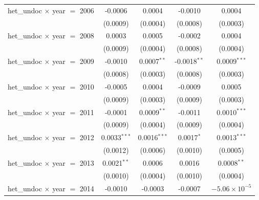 \begin{tabular}{lcccc}
   het\_undoc $\times$ year $=$ 2006               & -0.0006            & 0.0004                    & -0.0010                & 0.0004\\   
                                                   & (0.0009)           & (0.0004)                  & (0.0008)               & (0.0003)\\   
   het\_undoc $\times$ year $=$ 2008               & 0.0003             & 0.0005                    & -0.0002                & 0.0004\\   
                                                   & (0.0009)           & (0.0004)                  & (0.0008)               & (0.0004)\\   
   het\_undoc $\times$ year $=$ 2009               & -0.0010            & 0.0007$^{**}$             & -0.0018$^{**}$         & 0.0009$^{***}$\\   
                                                   & (0.0008)           & (0.0003)                  & (0.0008)               & (0.0003)\\   
   het\_undoc $\times$ year $=$ 2010               & -0.0005            & 0.0004                    & -0.0009                & 0.0005\\   
                                                   & (0.0009)           & (0.0003)                  & (0.0009)               & (0.0003)\\   
   het\_undoc $\times$ year $=$ 2011               & -0.0001            & 0.0009$^{**}$             & -0.0011                & 0.0010$^{***}$\\   
                                                   & (0.0009)           & (0.0004)                  & (0.0009)               & (0.0004)\\   
   het\_undoc $\times$ year $=$ 2012               & 0.0033$^{***}$     & 0.0016$^{***}$            & 0.0017$^{*}$           & 0.0013$^{***}$\\   
                                                   & (0.0012)           & (0.0006)                  & (0.0010)               & (0.0005)\\   
   het\_undoc $\times$ year $=$ 2013               & 0.0021$^{**}$      & 0.0006                    & 0.0016                 & 0.0008$^{**}$\\   
                                                   & (0.0010)           & (0.0004)                  & (0.0010)               & (0.0004)\\   
   het\_undoc $\times$ year $=$ 2014               & -0.0010            & -0.0003                   & -0.0007                & $-5.06\times 10^{-5}$\\    

\end{tabular}
